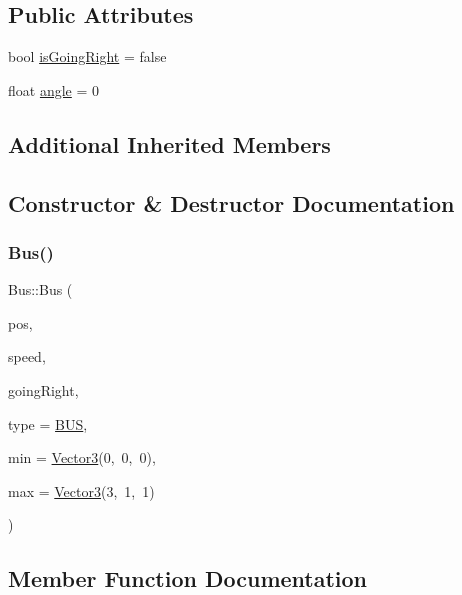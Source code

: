 \subsection*{Public Attributes}
\begin{DoxyCompactItemize}
\item 
bool \hyperlink{class_bus_ad27976dad538444f6e95212834d989a8}{is\+Going\+Right} = false
\item 
float \hyperlink{class_bus_ab2899ff7aa88eccd9ec84a79355b671b}{angle} = 0
\end{DoxyCompactItemize}
\subsection*{Additional Inherited Members}


\subsection{Constructor \& Destructor Documentation}
\mbox{\label{class_bus_a262505182585ed32d38dda38ab68147f}} 
\subsubsection{\texorpdfstring{Bus()}{Bus()}}
{\footnotesize\ttfamily Bus\+::\+Bus (\begin{DoxyParamCaption}\item[{\hyperlink{class_vector3}{Vector3}}]{pos,  }\item[{\hyperlink{class_vector3}{Vector3}}]{speed,  }\item[{bool}]{going\+Right,  }\item[{\hyperlink{_game_object_8h_a57678b60d65afb213d04a6b090c64a08}{Game\+Object\+Type}}]{type = {\ttfamily \hyperlink{_game_object_8h_a57678b60d65afb213d04a6b090c64a08a885a6a40e3fde5dfec3db7fefea61f9b}{B\+US}},  }\item[{\hyperlink{class_vector3}{Vector3}}]{min = {\ttfamily \hyperlink{class_vector3}{Vector3}(0,~0,~0)},  }\item[{\hyperlink{class_vector3}{Vector3}}]{max = {\ttfamily \hyperlink{class_vector3}{Vector3}(3,~1,~1)} }\end{DoxyParamCaption})\hspace{0.3cm}{\ttfamily [inline]}}



\subsection{Member Function Documentation}
\mbox{\label{class_bus_a7bff316b767441b92f8e82f17a44fbf7}} 
